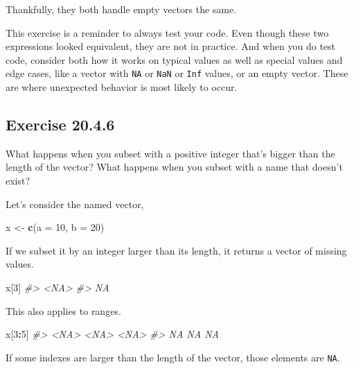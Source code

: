 \documentclass[]{book}
\newenvironment{Shaded}{\begin{snugshade}}{\end{snugshade}}
\newcommand{\CommentTok}[1]{\textcolor[rgb]{0.56,0.35,0.01}{\textit{#1}}}
\newcommand{\DataTypeTok}[1]{\textcolor[rgb]{0.13,0.29,0.53}{#1}}
\newcommand{\DecValTok}[1]{\textcolor[rgb]{0.00,0.00,0.81}{#1}}
\newcommand{\KeywordTok}[1]{\textcolor[rgb]{0.13,0.29,0.53}{\textbf{#1}}}
\newcommand{\NormalTok}[1]{#1}
\newcommand{\OperatorTok}[1]{\textcolor[rgb]{0.81,0.36,0.00}{\textbf{#1}}}
\newcommand{\StringTok}[1]{\textcolor[rgb]{0.31,0.60,0.02}{#1}}
\theoremstyle{plain}
\theoremstyle{remark}
\theoremstyle{definition}
\theoremstyle{definition}
\theoremstyle{definition}
\theoremstyle{remark}
\begin{document}
Thankfully, they both handle empty vectors the same.

This exercise is a reminder to always test your code. Even though these
two expressions looked equivalent, they are not in practice. And when
you do test code, consider both how it works on typical values as well
as special values and edge cases, like a vector with \texttt{NA} or
\texttt{NaN} or \texttt{Inf} values, or an empty vector. These are where
unexpected behavior is most likely to occur.

\hypertarget{exercise-20.4.6}{%
\subsection*{\texorpdfstring{Exercise
{20.4.6}}{Exercise 20.4.6}}\label{exercise-20.4.6}}

What happens when you subset with a positive integer that's bigger than
the length of the vector? What happens when you subset with a name that
doesn't exist?

Let's consider the named vector,

\begin{Shaded}
\begin{Highlighting}[]
\NormalTok{x <-}\StringTok{ }\KeywordTok{c}\NormalTok{(}\DataTypeTok{a =} \DecValTok{10}\NormalTok{, }\DataTypeTok{b =} \DecValTok{20}\NormalTok{)}
\end{Highlighting}
\end{Shaded}

If we subset it by an integer larger than its length, it returns a
vector of missing values.

\begin{Shaded}
\begin{Highlighting}[]
\NormalTok{x[}\DecValTok{3}\NormalTok{]}
\CommentTok{#> <NA> }
\CommentTok{#>   NA}
\end{Highlighting}
\end{Shaded}

This also applies to ranges.

\begin{Shaded}
\begin{Highlighting}[]
\NormalTok{x[}\DecValTok{3}\OperatorTok{:}\DecValTok{5}\NormalTok{]}
\CommentTok{#> <NA> <NA> <NA> }
\CommentTok{#>   NA   NA   NA}
\end{Highlighting}
\end{Shaded}

If some indexes are larger than the length of the vector, those elements
are \texttt{NA}.
\end{document}
